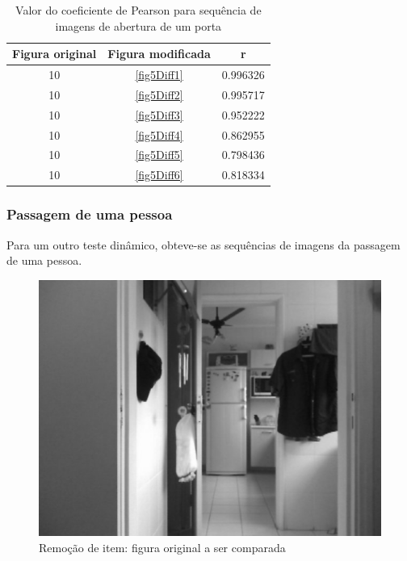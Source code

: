 \documentclass[10pt,a4paper]{article}
\begin{document}
\vspace{-0.5cm}
\begin{table}[h!]
  \begin{center}
    \caption{Valor do coeficiente de Pearson para sequência de imagens
      de abertura de um porta}
    \begin{tabular}{|c|c|c|}
      \hline
      Figura original & Figura modificada & r\\
      \hline
      10 &  \ref{fig5Diff1} & 0.996326\\
      10 &  \ref{fig5Diff2} & 0.995717\\
      10 &  \ref{fig5Diff3} & 0.952222\\
      10 &  \ref{fig5Diff4} & 0.862955\\
      10 &  \ref{fig5Diff5} & 0.798436\\
      10 &  \ref{fig5Diff6} & 0.818334\\
      \hline
    \end{tabular}
  \end{center}
\end{table}


\newpage
\subsubsection{Passagem de uma pessoa}
Para um outro teste dinâmico, obteve-se as sequências de imagens da
passagem de uma pessoa.

\begin{figure}[h!]
\begin{center}
\includegraphics[scale=0.35]{photos/pessoa/gBase}
\caption{Remoção de item: figura original a ser comparada}
\end{center}
\label{pessoa}
\end{figure}
\end{document}
